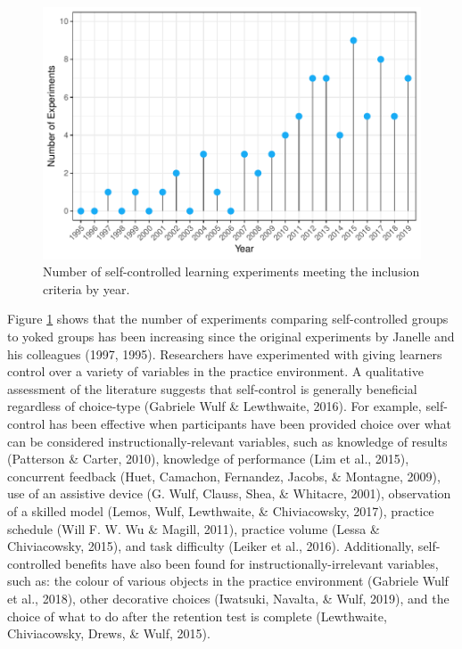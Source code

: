 \documentclass[
  english,
  man, donotrepeattitle,floatsintext]{apa7}
\begin{document}
\begin{figure}

{\centering \includegraphics[height=0.51\textheight]{../../figs/fig1} 

}

\caption{Number of self-controlled learning experiments meeting the inclusion criteria by year.}\label{fig:fig1}
\end{figure}

Figure \ref{fig:fig1} shows that the number of experiments comparing self-controlled groups to yoked groups has been increasing since the original experiments by Janelle and his colleagues (1997, 1995). Researchers have experimented with giving learners control over a variety of variables in the practice environment. A qualitative assessment of the literature suggests that self-control is generally beneficial regardless of choice-type (Gabriele Wulf \& Lewthwaite, 2016). For example, self-control has been effective when participants have been provided choice over what can be considered instructionally-relevant variables, such as knowledge of results (Patterson \& Carter, 2010), knowledge of performance (Lim et al., 2015), concurrent feedback (Huet, Camachon, Fernandez, Jacobs, \& Montagne, 2009), use of an assistive device (G. Wulf, Clauss, Shea, \& Whitacre, 2001), observation of a skilled model (Lemos, Wulf, Lewthwaite, \& Chiviacowsky, 2017), practice schedule (Will F. W. Wu \& Magill, 2011), practice volume (Lessa \& Chiviacowsky, 2015), and task difficulty (Leiker et al., 2016). Additionally, self-controlled benefits have also been found for instructionally-irrelevant variables, such as: the colour of various objects in the practice environment (Gabriele Wulf et al., 2018), other decorative choices (Iwatsuki, Navalta, \& Wulf, 2019), and the choice of what to do after the retention test is complete (Lewthwaite, Chiviacowsky, Drews, \& Wulf, 2015).
\end{document}
